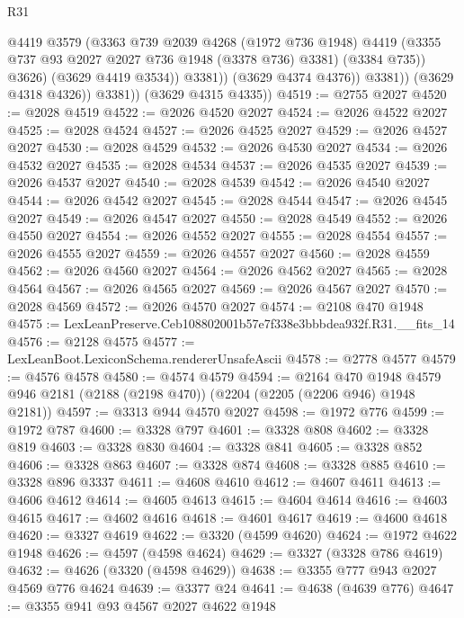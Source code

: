 \begin{lexlean}{R31}
\begin{coremodule}
                          @4419
                          @3579
                          (@3363
                            @739
                            @2039
                            @4268
                            (@1972 @736 @1948)
                            @4419
                            (@3355 @737 @93 @2027 @2027 @736 @1948 (@3378 @736) @3381)
                            (@3384 @735))
                          @3626)
                        (@3629 @4419 @3534))
                      @3381))
                  (@3629 @4374 @4376))
                @3381))
            (@3629 @4318 @4326))
          @3381))
      (@3629 @4315 @4335))
@4519 := @2755 @2027
@4520 := @2028 @4519
@4522 := @2026 @4520 @2027
@4524 := @2026 @4522 @2027
@4525 := @2028 @4524
@4527 := @2026 @4525 @2027
@4529 := @2026 @4527 @2027
@4530 := @2028 @4529
@4532 := @2026 @4530 @2027
@4534 := @2026 @4532 @2027
@4535 := @2028 @4534
@4537 := @2026 @4535 @2027
@4539 := @2026 @4537 @2027
@4540 := @2028 @4539
@4542 := @2026 @4540 @2027
@4544 := @2026 @4542 @2027
@4545 := @2028 @4544
@4547 := @2026 @4545 @2027
@4549 := @2026 @4547 @2027
@4550 := @2028 @4549
@4552 := @2026 @4550 @2027
@4554 := @2026 @4552 @2027
@4555 := @2028 @4554
@4557 := @2026 @4555 @2027
@4559 := @2026 @4557 @2027
@4560 := @2028 @4559
@4562 := @2026 @4560 @2027
@4564 := @2026 @4562 @2027
@4565 := @2028 @4564
@4567 := @2026 @4565 @2027
@4569 := @2026 @4567 @2027
@4570 := @2028 @4569
@4572 := @2026 @4570 @2027
@4574 := @2108 @470 @1948
@4575 := LexLeanPreserve.Ceb108802001b57e7f338e3bbbdea932f.R31.__fits_14
@4576 := @2128 @4575
@4577 := LexLeanBoot.LexiconSchema.rendererUnsafeAscii
@4578 := @2778 @4577
@4579 := @4576 @4578
@4580 := @4574 @4579
@4594 := @2164
    @470
    @1948
    @4579
    @946
    @2181
    (@2188 (@2198 @470))
    (@2204 (@2205 (@2206 @946) @1948 @2181))
@4597 := @3313 @944 @4570 @2027
@4598 := @1972 @776
@4599 := @1972 @787
@4600 := @3328 @797
@4601 := @3328 @808
@4602 := @3328 @819
@4603 := @3328 @830
@4604 := @3328 @841
@4605 := @3328 @852
@4606 := @3328 @863
@4607 := @3328 @874
@4608 := @3328 @885
@4610 := @3328 @896 @3337
@4611 := @4608 @4610
@4612 := @4607 @4611
@4613 := @4606 @4612
@4614 := @4605 @4613
@4615 := @4604 @4614
@4616 := @4603 @4615
@4617 := @4602 @4616
@4618 := @4601 @4617
@4619 := @4600 @4618
@4620 := @3327 @4619
@4622 := @3320 (@4599 @4620)
@4624 := @1972 @4622 @1948
@4626 := @4597 (@4598 @4624)
@4629 := @3327 (@3328 @786 @4619)
@4632 := @4626 (@3320 (@4598 @4629))
@4638 := @3355 @777 @943 @2027 @4569 @776 @4624
@4639 := @3377 @24
@4641 := @4638 (@4639 @776)
@4647 := @3355 @941 @93 @4567 @2027 @4622 @1948

\end{coremodule}
\end{lexlean}

